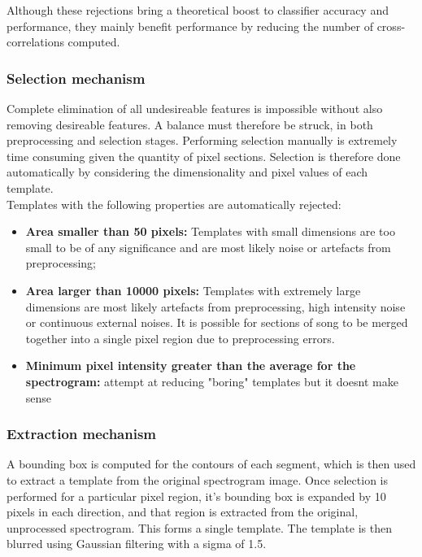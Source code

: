 Although these rejections bring a theoretical boost to classifier accuracy and
performance, they mainly benefit performance by reducing the number of
cross-correlations computed.

\subsubsection{Selection mechanism}
Complete elimination of all undesireable features is impossible without also
removing desireable features.
A balance must therefore be struck, in both preprocessing and selection stages.
Performing selection manually is extremely time consuming given the quantity
of pixel sections.
Selection is therefore done automatically by considering the dimensionality and
pixel values of each template.\\


Templates with the following properties are automatically rejected:
\begin{itemize}[noitemsep]
  \item \textbf{Area smaller than 50 pixels:} Templates with small dimensions
    are too small to be of any significance and are most likely noise or
    artefacts from preprocessing;

  \item \textbf{Area larger than 10000 pixels:} Templates with extremely large
    dimensions are most likely artefacts from preprocessing, high intensity
    noise or continuous external noises.
    It is possible for sections of song to be merged together into a single
    pixel region due to preprocessing errors.

  \item \textbf{Minimum pixel intensity greater than the average for the
    spectrogram:} attempt at reducing "boring" templates
    but it doesnt make sense
\end{itemize}


\subsubsection{Extraction mechanism}\label{sec:extract}

A bounding box is computed for the contours of each segment, which is then used
to extract a template from the original spectrogram image.
Once selection is performed for a particular pixel region, it's bounding box is
expanded by 10 pixels in each direction, and that region is extracted from the
original, unprocessed spectrogram.
This forms a single template.
The template is then blurred using Gaussian filtering with a sigma of 1.5.

